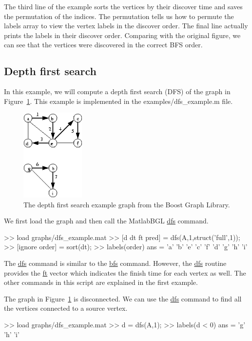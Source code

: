 \documentclass[12pt]{article}
\newcommand{\mycmd}[1]{\url{#1}}
\newcommand{\mypath}[1]{{\ttfamily \small #1}}
\begin{document}
The third line of the example sorts the vertices by their discover time and saves the permutation of the indices.  The permutation tells us how to permute the labels array to view the vertex labels in the discover order.  The final line actually prints the labels in their discover order.  Comparing with the original figure, we can see that the vertices were discovered in the correct BFS order.

\subsection{Depth first search}

In this example, we will compute a depth first search (DFS) of the graph in Figure~\ref{fig:dfs}.  This example is implemented in the \mypath{examples/dfs\_example.m} file.

\begin{figure}[ht!]
\centering
\includegraphics[width=1.25in]{dfs}
\caption{The depth first search example graph from the Boost Graph Library.}
\label{fig:dfs}
\end{figure}

We first load the graph and then call the MatlabBGL \mycmd{dfs} command.  
\begin{mcode}
>> load graphs/dfs_example.mat
>> [d dt ft pred] = dfs(A,1,struct('full',1));
>> [ignore order] = sort(dt);
>> labels(order)
ans = 
    'a'
    'b'
    'e'
    'c'
    'f'
    'd'
    'g'
    'h'
    'i'
\end{mcode}

The \mycmd{dfs} command is similar to the \mycmd{bfs} command.  However, the \mycmd{dfs} routine provides the \mycmd{ft} vector which indicates the finish time for each vertex as well.  The other commands in this script are explained in the first example. 

The graph in Figure~\ref{fig:dfs} is disconnected.  We can use the \mycmd{dfs} command to find all the vertices connected to a source vertex.  

\begin{mcode}
>> load graphs/dfs_example.mat
>> d = dfs(A,1);
>> labels(d < 0)
ans = 
    'g'
    'h'
    'i'
\end{mcode}
\end{document}
